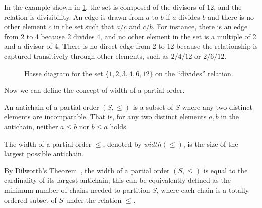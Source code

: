 \begin{example} \label{ex:hasse}
    In the example shown in \cref{fig:hasse_diagram_example}, the set is composed of the divisors of 12, and the relation is divisibility. An edge is drawn from $a$ to $b$ if $a$ divides $b$ and there is no other element $c$ in the set such that $a/c$ and $c/b$. For instance, there is an edge from 2 to 4 because 2 divides 4, and no other element in the set is a multiple of 2 and a divisor of 4. There is no direct edge from 2 to 12 because the relationship is captured transitively through other elements, such as $2/4/12$ or $2/6/12$.
    \begin{figure}[H]
        \centering
        \caption{Hasse diagram for the set $\{1, 2, 3, 4, 6, 12\}$ on the ``divides'' relation.}
        \label{fig:hasse_diagram_example}
    \end{figure}
\end{example}

Now we can define the concept of width of a partial order.

\begin{definition}[Antichain]
    An antichain of a partial order $(S, \leq)$ is a subset of $S$ where any two distinct elements are incomparable. That is, for any two distinct elements $a, b$ in the antichain, neither $a \leq b$ nor $b \leq a$ holds.
\end{definition}

\begin{definition}
    The width of a partial order $\leq$, denoted by $width(\leq)$, is the size of the largest possible antichain.
\end{definition}

By Dilworth's Theorem~\cite{dilworth1990decomposition}, the width of a partial order $(S, \leq)$ is equal to the cardinality of its largest antichain; this can be equivalently defined as the minimum number of chains needed to partition $S$, where each chain is a totally ordered subset of $S$ under the relation $\leq$. 

